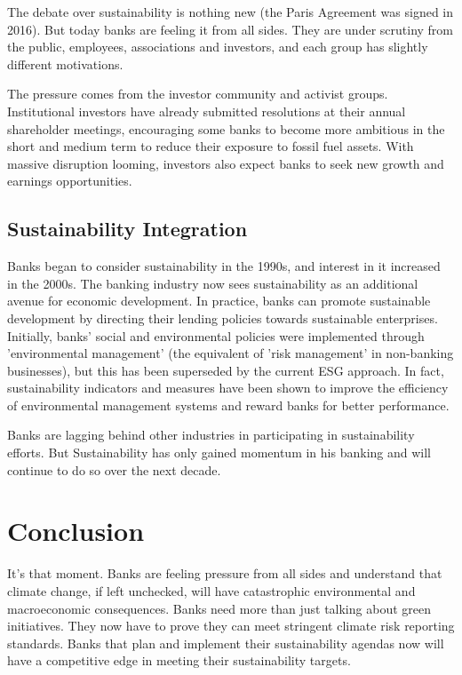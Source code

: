 \documentclass{ifacconf}
\begin{document}
The debate over sustainability is nothing new (the Paris Agreement was signed in 2016). But today banks are feeling it from all sides. They are under scrutiny from the public, employees, associations and investors, and each group has slightly different motivations.

The pressure comes from the investor community and activist groups. Institutional investors have already submitted resolutions at their annual shareholder meetings, encouraging some banks to become more ambitious in the short and medium term to reduce their exposure to fossil fuel assets. With massive disruption looming, investors also expect banks to seek new growth and earnings opportunities.


\subsection{Sustainability Integration}

Banks began to consider sustainability in the 1990s, and interest in it increased in the 2000s. The banking industry now sees sustainability as an additional avenue for economic development. In practice, banks can promote sustainable development by directing their lending policies towards sustainable enterprises.  Initially, banks' social and environmental policies were implemented through 'environmental management' (the equivalent of 'risk management' in non-banking businesses), but this has been superseded by the current ESG approach. In fact, sustainability indicators and measures have been shown to improve the efficiency of environmental management systems and reward banks for better performance.

Banks are lagging behind other industries in participating in sustainability efforts. But Sustainability has only gained momentum in his banking and will continue to do so over the next decade.


\section{Conclusion}

It's that moment. Banks are feeling pressure from all sides and understand that climate change, if left unchecked, will have catastrophic environmental and macroeconomic consequences. Banks need more than just talking about green initiatives. They now have to prove they can meet stringent climate risk reporting standards.
Banks that plan and implement their sustainability agendas now will have a competitive edge in meeting their sustainability targets.
\end{document}
